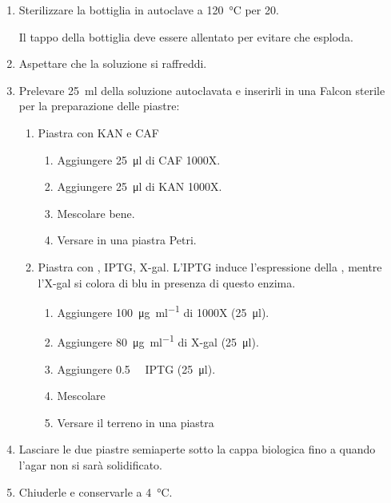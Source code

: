 \begin{enumerate}
	\item Sterilizzare la bottiglia in autoclave a \qty{120}{\celsius}  per \qty{20}{\min}.
	      \begin{Attenzione}
		      Il tappo della bottiglia deve essere allentato per evitare che esploda.
	      \end{Attenzione}
	\item Aspettare che la soluzione si raffreddi.
	\item Prelevare \qty{25}{\ml} della soluzione autoclavata e inserirli in una Falcon sterile per la preparazione delle piastre:
	      \begin{enumerate}[label=\Alph*)]
		      \item Piastra con \gls{KAN} e \gls{CAF}
		            \begin{enumerate}[label=\arabic*.]
			            \item Aggiungere \qty{25}{\micro\litre} di \gls{CAF} 1000X.
			            \item Aggiungere \qty{25}{\micro\litre} di \gls{KAN} 1000X.
			            \item Mescolare bene.
			            \item Versare in una piastra Petri.
		            \end{enumerate}
		      \item Piastra con , \gls{IPTG}, \gls{X-gal}. L’IPTG induce l’espressione della , mentre l’\gls{X-gal} si colora di blu in presenza di questo enzima.
		            \begin{enumerate}[label=\arabic*.]
			            \item Aggiungere \qty{100}{\ug\per\ml} di  1000X (\qty{25}{\micro\litre}).
			            \item Aggiungere \qty{80}{\ug\per\ml} di \gls{X-gal} (\qty{25}{\micro\litre}).
			            \item Aggiungere \qty{0.5}{\milli\Molar} \gls{IPTG} (\qty{25}{\micro\litre}).
			            \item Mescolare
			            \item Versare il terreno in una piastra
		            \end{enumerate}
	      \end{enumerate}
	\item Lasciare le due piastre semiaperte sotto la cappa biologica fino a quando l’agar non si sarà solidificato.
	\item Chiuderle e conservarle a \qty{4}{\celsius}.
\end{enumerate}

